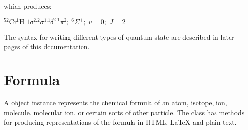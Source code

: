 \documentclass[letterpaper,10pt,english]{sphinxmanual}
\begin{document}
\begin{sphinxVerbatim}[commandchars=\\\{\}]
 \PYG{p}{[}\PYG{p}{]}   
 \PYG{p}{[}\PYG{p}{]} 
    
\end{sphinxVerbatim}

which produces:



$\mathrm{{}^{52}Cr^1H} \; 1\sigma^2.2\sigma^1.1\delta^2.1\pi^2; \; {}^6\Sigma^+; \; v=0; \; J=2$

The syntax for writing different types of quantum state are described in later pages of this documentation.


\chapter{Formula}
\label{\detokenize{formula:formula}}\label{\detokenize{formula::doc}}
A  object instance represents the chemical formula of an atom, isotope, ion, molecule, molecular ion, or certain sorts of other particle. The  class has methods for producing representations of the formula in HTML, LaTeX and plain text.
\end{document}
